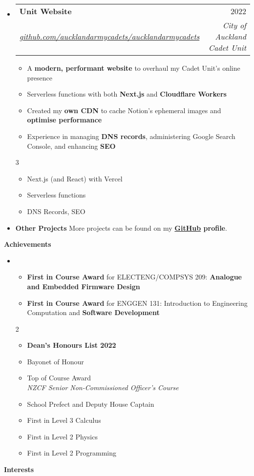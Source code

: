 \documentclass[11pt,a4paper]{article}[leftmargin=*]
\makeatletter
\def \entryspacing {-0pt}
\def \bulletstylei {\faAngleRight\hspace{-4.5pt}}
\def \bulletstyleii {\faCaretRight\hspace{-4.5pt}}
\renewcommand{\section}[2]{\vspace{5pt}
  \colorbox{secondary}{\color{white}\raggedbottom\normalsize\textbf{{#1}{\hspace{2pt}#2\hspace{4pt}}}}
}
\newcommand{\resumeEntryStart}{\begin{itemize}[leftmargin=2.5mm]}
\newcommand{\resumeEntryEnd}{\end{itemize}\vspace{\entryspacing}}
\newcommand{\resumeItemListStart}{\begin{itemize}[leftmargin=4.5mm]}
\newcommand{\resumeItemListEnd}{\end{itemize}}
\newcommand{\resumeItemListStartColumns}[2][-0.5]{\vspace*{#1\multicolsep}
\begin{multicols}{#2}\begin{itemize}[leftmargin=4.5mm]}
\newcommand{\resumeItemListEndColumns}[1][-1]{\end{itemize}\end{multicols}\vspace*{#1\multicolsep}}
\newcommand{\resumeItem}[2][\bulletstylei]{
  \item[\small#1]\small{
    {#2 \vspace{-2pt}}
  }
}
\newcommand{\resumeEntryTSDL}[4]{
  \vspace{-1pt}\item[]
    \begin{tabularx}{0.97\textwidth}{X@{\hspace{60pt}}r}
      \textbf{\color{primary}#1} & {\firabook\color{accent}\small#2} \\
      \textit{\color{accent}\small#3} & \textit{\color{accent}\small#4} \\
    \end{tabularx}\vspace{-6pt}
}
\newcommand{\resumeEntryS}[2]{
  \item[]\small{
    \textbf{\color{primary}#1 }{ #2 \vspace{-4pt}}
  }
}
\newcommand{\resumeIt}[1]{\textit{\color{accent}#1}}
\newcommand{\resumeBf}[1]{\small\textbf{\color{halfbold}#1}}
\makeatother
\begin{document}
\resumeEntryStart
\resumeEntryTSDL
{Unit Website}{2022}
{\href{https://github.com/aucklandarmycadets/aucklandarmycadets}{github.com/aucklandarmycadets/aucklandarmycadets}}{City of Auckland Cadet Unit}
\resumeItemListStart
\resumeItem {A \resumeBf{modern, performant website} to overhaul my Cadet Unit's online presence}
\resumeItem {Serverless functions with both \resumeBf{Next.js} and \resumeBf{Cloudflare Workers}}
\resumeItem {Created my \resumeBf{own CDN} to cache Notion's ephemeral images and \resumeBf{optimise performance}}
\resumeItem {Experience in managing \resumeBf{DNS records}, administering Google Search Console, and enhancing \resumeBf{SEO}}
\resumeItemListEnd
\resumeItemListStartColumns{3}
\resumeItem[\bulletstyleii] {Next.js (and React) with Vercel}
\resumeItem[\bulletstyleii] {Serverless functions}
\resumeItem[\bulletstyleii] {DNS Records, SEO}
\resumeItemListEndColumns
\resumeEntryEnd

\resumeEntryStart
\resumeEntryS
{Other Projects}{More projects can be found on my \resumeBf{\href{https://github.com/jamesnzl}{GitHub} profile}.}
\resumeEntryEnd


\section{\faTrophy}{Achievements}

\resumeEntryStart
\item[]
\resumeItemListStart
\resumeItem {\resumeBf{First in Course Award} for ELECTENG/COMPSYS 209: \resumeBf{Analogue and Embedded Firmware Design}}
\resumeItem {\resumeBf{First in Course Award} for ENGGEN 131: Introduction to Engineering Computation and \resumeBf{Software Development}}
\resumeItemListEnd

\resumeItemListStartColumns{2}
\resumeItem {\resumeBf{Dean's Honours List 2022}}
\resumeItem {Bayonet of Honour}
\resumeItem {Top of Course Award\\\resumeIt{NZCF Senior Non-Commissioned Officer's Course}}
\resumeItem {School Prefect and Deputy House Captain}
\resumeItem {First in Level 3 Calculus}
\resumeItem {First in Level 2 Physics}
\resumeItem {First in Level 2 Programming}
\resumeItemListEndColumns
\resumeEntryEnd


\section{\faUserCircle}{Interests}
\end{document}
